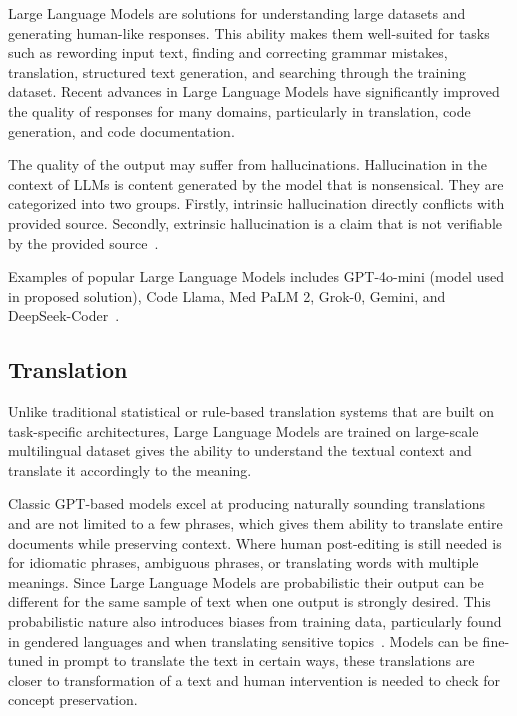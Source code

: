 Large Language Models are solutions for understanding large datasets and generating human-like responses.
This ability makes them well-suited for tasks such as rewording input text, finding and correcting
grammar mistakes, translation, structured text generation, and searching through the training dataset.
Recent advances in Large Language Models have significantly improved the quality of responses for many domains,
particularly in translation, code generation, and code documentation.

The quality of the output may suffer from hallucinations.
Hallucination in the context of LLMs is content generated by the model that is nonsensical.
They are categorized into two groups.
Firstly, intrinsic hallucination directly conflicts with provided source.
Secondly, extrinsic hallucination is a claim that is not verifiable by the provided source~\parencite{minaee2025_llm_suvey}.

Examples of popular Large Language Models includes GPT-4o-mini (model used in proposed solution), Code Llama, Med PaLM 2,
Grok-0, Gemini, and DeepSeek-Coder~\parencite{minaee2025_llm_suvey}.

\subsection{Translation}\label{subsec:translation}
Unlike traditional statistical or rule-based translation systems that are built on task-specific architectures,
Large Language Models are trained on large-scale multilingual dataset gives the ability to understand the textual context
and translate it accordingly to the meaning.

Classic GPT-based models excel at producing naturally sounding translations and are not limited to a few phrases,
which gives them ability to translate entire documents while preserving context.
Where human post-editing is still needed is for idiomatic phrases, ambiguous phrases, or translating words with multiple meanings.
Since Large Language Models are probabilistic their output can be different for the same sample of text when one output is strongly desired.
This probabilistic nature also introduces biases from training data,
particularly found in gendered languages and when translating sensitive topics~\parencite[Quality of AI Translations: Successes and Gaps]{ablaikhan_translation_ai}.
Models can be fine-tuned in prompt to translate the text in certain ways,
these translations are closer to transformation of a text and human intervention is needed to check for concept preservation.

